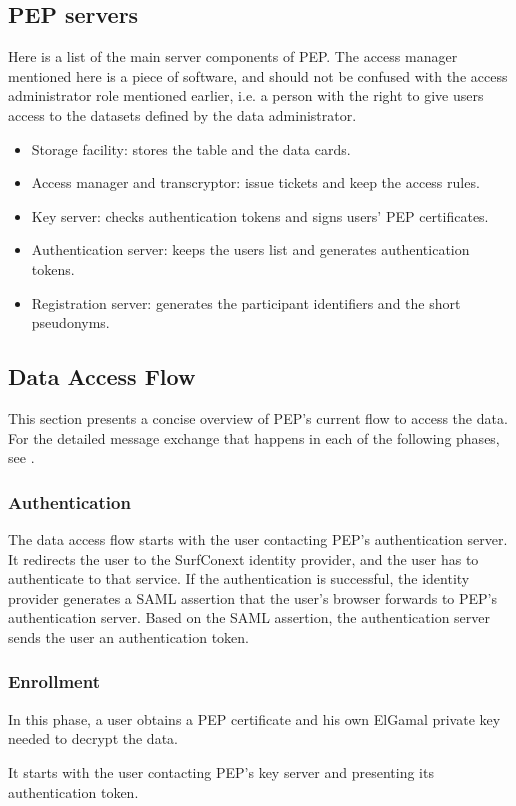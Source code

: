 \documentclass{report}
\begin{document}
\subsection{PEP servers}
Here is a list of the main server components of PEP. The access manager mentioned here is a piece of software, and should not be confused with the access administrator role mentioned
earlier, i.e. a person with the right to give users access to the datasets defined by the data administrator.
\begin{itemize}
		\item Storage facility: stores the table and the data cards.
		\item Access manager and transcryptor: issue tickets and keep the access rules.
		\item Key server: checks authentication tokens and signs users' PEP certificates.
		\item Authentication server: keeps the users list and generates authentication tokens. 
		\item Registration server: generates the participant identifiers and the short pseudonyms.
\end{itemize}

\subsection{Data Access Flow}
This section presents a concise overview of PEP's current flow to access the data. For the detailed message exchange that happens in each of the following phases, see
\cite{pep-blueprint}.

\subsubsection{Authentication}
The data access flow starts with the user contacting PEP's authentication server. It redirects the user to the SurfConext identity provider, and the user has to authenticate to
that service. If the authentication is successful, the identity provider generates a SAML assertion that the user's browser forwards to PEP's authentication server. Based on the
SAML assertion, the authentication server sends the user an authentication token.


\subsubsection{Enrollment}
In this phase, a user obtains a PEP certificate and his own ElGamal private key needed to decrypt the data. \par
It starts with the user contacting PEP's key server and presenting its authentication token. 
\end{document}
